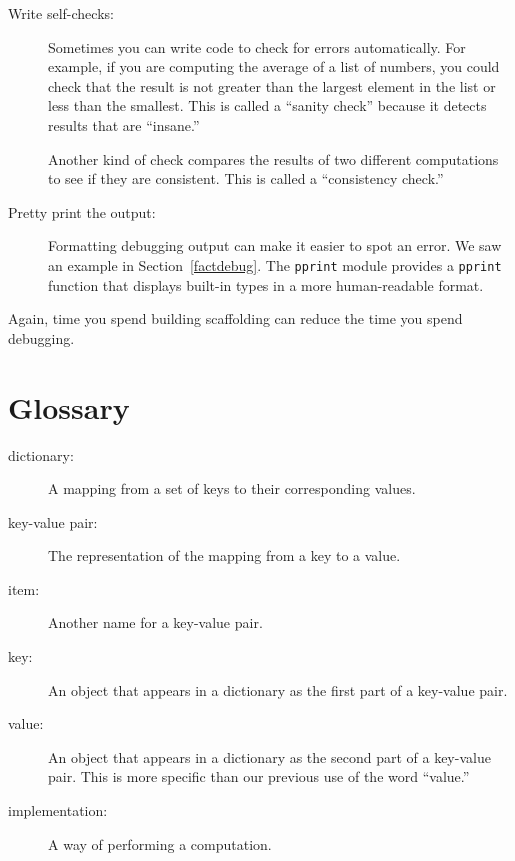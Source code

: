 \documentclass[10pt]{book}
\begin{document}
\begin{CJK}{UTF8}{gbsn}
\begin{description}
\item[Write self-checks:]  Sometimes you can write code to check
for errors automatically.  For example, if you are computing the
average of a list of numbers, you could check that the result is
not greater than the largest element in the list or less than
the smallest.  This is called a ``sanity check'' because it detects
results that are ``insane.''

Another kind of check compares the results of two different
computations to see if they are consistent.  This is called a
``consistency check.''

\item[Pretty print the output:] Formatting debugging output
can make it easier to spot an error.  We saw an example in
Section~\ref{factdebug}.  The {\tt pprint} module provides
a {\tt pprint} function that displays built-in types in
a more human-readable format.

\end{description}

Again, time you spend building scaffolding can reduce
the time you spend debugging.

\section{Glossary}

\begin{description}

\item[dictionary:] A mapping from a set of keys to their
corresponding values.

\item[key-value pair:] The representation of the mapping from
a key to a value.

\item[item:] Another name for a key-value pair.

\item[key:] An object that appears in a dictionary as the
first part of a key-value pair.

\item[value:] An object that appears in a dictionary as the
second part of a key-value pair.  This is more specific than
our previous use of the word ``value.''

\item[implementation:] A way of performing a computation.


\end{description}
\end{CJK}
\end{document}
